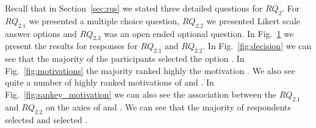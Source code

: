 \begin{figure}[t!]
\centering
\vspace{-.3cm}
    \hfill
    \hfill
    \hfill
    \caption{\rqTwo}
     \label{fig:decision_motivations}
     \vspace{-.3cm}
\end{figure}




\nd \textbf{\rqTwo}

Recall that in Section~\ref{sec:rqs} we stated three detailed questions for $RQ_{2}$. For $RQ_{2.1}$ we presented a multiple choice question, $RQ_{2.2}$ we presented Likert scale answer options and $RQ_{2.3}$ was an open ended optional question. 
In Fig.~\ref{fig:decision_motivations} we present the results for responses for $RQ_{2.1}$ and $RQ_{2.2}$. In Fig.~\ref{fig:decision} we can see that the majority of the participants selected the option . In Fig.~\ref{fig:motivations} the majority ranked highly the motivation . We also see quite a number of highly ranked motivations of  and . In Fig.~\ref{fig:sankey_motivation} we can also see the association between the $RQ_{2.1}$ and $RQ_{2.2}$ on the axies of  and . We can see that the majority of respondents selected  and selected . 

